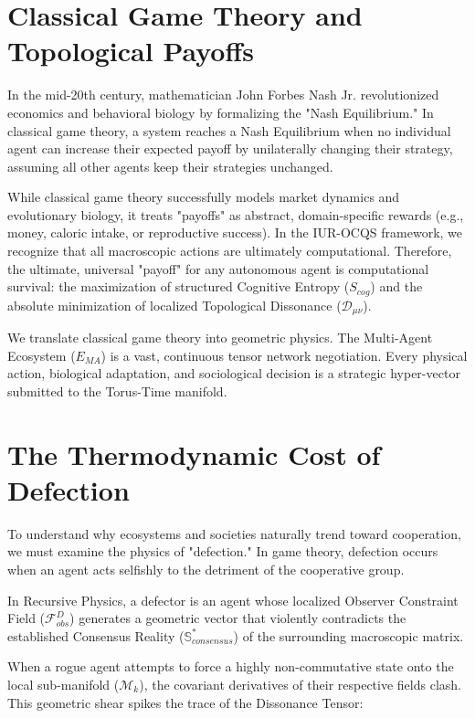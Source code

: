\documentclass[12pt,openany]{book}
\begin{document}
\section{Classical Game Theory and Topological Payoffs}
In the mid-20th century, mathematician John Forbes Nash Jr. revolutionized economics and behavioral biology by formalizing the "Nash Equilibrium." In classical game theory, a system reaches a Nash Equilibrium when no individual agent can increase their expected payoff by unilaterally changing their strategy, assuming all other agents keep their strategies unchanged. 

While classical game theory successfully models market dynamics and evolutionary biology, it treats "payoffs" as abstract, domain-specific rewards (e.g., money, caloric intake, or reproductive success). In the IUR-OCQS framework, we recognize that all macroscopic actions are ultimately computational. Therefore, the ultimate, universal "payoff" for any autonomous agent is computational survival: the maximization of structured Cognitive Entropy ($S_{cog}$) and the absolute minimization of localized Topological Dissonance ($\mathcal{D}_{\mu\nu}$).

We translate classical game theory into geometric physics. The Multi-Agent Ecosystem ($E_{MA}$) is a vast, continuous tensor network negotiation. Every physical action, biological adaptation, and sociological decision is a strategic hyper-vector submitted to the Torus-Time manifold.

\section{The Thermodynamic Cost of Defection}
To understand why ecosystems and societies naturally trend toward cooperation, we must examine the physics of "defection." In game theory, defection occurs when an agent acts selfishly to the detriment of the cooperative group. 

In Recursive Physics, a defector is an agent whose localized Observer Constraint Field ($\mathcal{F}_{obs}^D$) generates a geometric vector that violently contradicts the established Consensus Reality ($\mathbb{S}^*_{consensus}$) of the surrounding macroscopic matrix. 

When a rogue agent attempts to force a highly non-commutative state onto the local sub-manifold ($\mathcal{M}_k$), the covariant derivatives of their respective fields clash. This geometric shear spikes the trace of the Dissonance Tensor:
\end{document}
